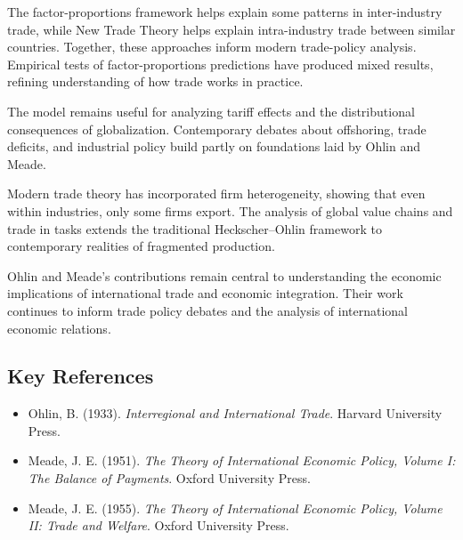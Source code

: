 The factor-proportions framework helps explain some patterns in inter-industry
trade, while New Trade Theory helps explain intra-industry trade between similar
countries. Together, these approaches inform modern trade-policy analysis.
Empirical tests of factor-proportions predictions have produced mixed results,
refining understanding of how trade works in practice.

The model remains useful for analyzing tariff effects and the distributional
consequences of globalization. Contemporary debates about offshoring, trade
deficits, and industrial policy build partly on foundations laid by Ohlin and
Meade.

Modern trade theory has incorporated firm heterogeneity, showing that even
within industries, only some firms export. The analysis of global value
chains and trade in tasks extends the traditional Heckscher--Ohlin framework
to contemporary realities of fragmented production.

Ohlin and Meade's contributions remain central to understanding the economic
implications of international trade and economic integration. Their work
continues to inform trade policy debates and the analysis of international
economic relations.

\subsection*{Key References}
\begin{itemize}
    \item Ohlin, B. (1933). \textit{Interregional and International Trade}.
    Harvard University Press.
    \item Meade, J. E. (1951). \textit{The Theory of International Economic Policy, Volume I:
    The Balance of Payments}. Oxford University Press.
    \item Meade, J. E. (1955). \textit{The Theory of International Economic Policy, Volume II:
    Trade and Welfare}. Oxford University Press.
\end{itemize}
